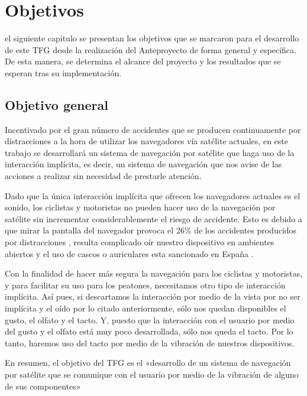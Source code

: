 \chapter{Objetivos}
\label{chap:objetivos}

 el siguiente capítulo se presentan los objetivos que se marcaron para el desarrollo de
este \acf{TFG} desde la realización del Anteproyecto de forma general y específica. De esta manera,
se determina el alcance del proyecto y los resultados que se esperan tras su implementación.

\section{Objetivo general}

Incentivado por el gran número de accidentes que se producen continuamente por distracciones a la
hora de utilizar los navegadores vía satélite actuales, en este trabajo se desarrollará un sistema
de navegación por satélite que haga uso de la interacción implícita, es decir, un sistema de
navegación que nos avise de las acciones a realizar sin necesidad de prestarle atención.

Dado que la única interacción implícita que ofrecen los navegadores actuales es el sonido, los
ciclistas y motoristas no pueden hacer uso de la navegación por satélite sin incrementar
considerablemente el riesgo de accidente. Esto es debido a que mirar la pantalla del navegador
provoca el 26\% de los accidentes producidos por distracciones \cite{Allianz14}, resulta complicado
oír nuestro dispositivo en ambientes abiertos y el uso de cascos o auriculares esta sancionado en
España \cite{Serrano14}.

Con la finalidad de hacer más segura la navegación para los ciclistas y motoristas, y para facilitar
su uso para los peatones, necesitamos otro tipo de interacción implícita. Así pues, si descartamos
la interacción por medio de la vista por no ser implícita y el oído por lo citado anteriormente,
sólo nos quedan disponibles el gusto, el olfato y el tacto. Y, puesto que la interacción con el
usuario por medio del gusto y el olfato está muy poco desarrollada, sólo nos queda el tacto. Por
lo tanto, haremos uso del tacto por medio de la vibración de nuestros dispositivos.

En resumen, el objetivo del \acf{TFG} es el «desarrollo de un sistema de navegación
  por satélite que se comunique con el usuario por medio de la vibración de alguno de sus
  componentes»

